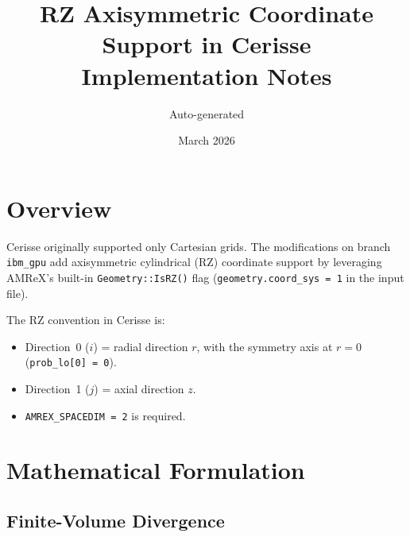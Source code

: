 \documentclass[11pt,a4paper]{article}
\title{\textbf{RZ Axisymmetric Coordinate Support in Cerisse}\\[4pt]
       \large Implementation Notes}
\author{Auto-generated}
\date{March 2026}
\begin{document}
\maketitle

\section{Overview}

Cerisse originally supported only Cartesian grids.  The modifications on
branch \texttt{ibm\_gpu} add axisymmetric cylindrical (RZ) coordinate
support by leveraging AMReX's built-in \texttt{Geometry::IsRZ()} flag
(\texttt{geometry.coord\_sys = 1} in the input file).

The RZ convention in Cerisse is:
\begin{itemize}
  \item Direction~0 ($i$) = radial direction $r$, with the symmetry axis at
        $r = 0$ (\texttt{prob\_lo[0] = 0}).
  \item Direction~1 ($j$) = axial direction $z$.
  \item \texttt{AMREX\_SPACEDIM = 2} is required.
\end{itemize}

\section{Mathematical Formulation}

\subsection{Finite-Volume Divergence}
\end{document}
